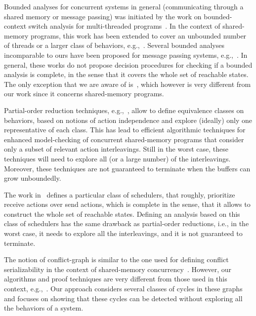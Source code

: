Bounded analyses for concurrent systems in general (communicating through a shared memory or message passing) was initiated by the work on bounded-context switch analysis for multi-threaded programs~\cite{DBLP:conf/pldi/QadeerW04,DBLP:conf/tacas/QadeerR05,DBLP:conf/cav/LalR08}. In the context of shared-memory programs, this work has been extended to cover an unbounded number of threads or a larger class of behaviors, e.g.,~\cite{DBLP:conf/sas/BouajjaniEP11,DBLP:conf/popl/EmmiQR11,DBLP:conf/spin/KiddJV10,DBLP:conf/cav/TorreMP10}. Several bounded analyses incomparable to ours have been proposed for message passing systems, e.g.,~\cite{DBLP:conf/tacas/TorreMP08,DBLP:conf/tacas/BouajjaniE12}. In general, these works do not propose decision procedures for checking if a bounded analysis is complete, in the sense that it covers the whole set of reachable states. The only exception that we are aware of is~\cite{DBLP:conf/cav/TorreMP10}, which however is very different from our work since it concerns shared-memory programs.

Partial-order reduction techniques, e.g.,~\cite{DBLP:conf/popl/AbdullaAJS14,DBLP:conf/popl/FlanaganG05}, allow to define equivalence classes on behaviors, based on notions of action independence and explore (ideally) only one representative of each class. This has lead to efficient algorithmic techniques for enhanced model-checking of concurrent shared-memory programs that consider only a subset of relevant action interleavings. Still in the worst case, these techniques will need to explore all (or a large number) of the interleavings. Moreover, these techniques are not guaranteed to terminate when the buffers can grow unboundedly.

The work in~\cite{DBLP:conf/oopsla/Desai0M14} defines a particular class of schedulers, that roughly, prioritize receive actions over send actions, which is complete in the sense, that it allows to construct the whole set of reachable states. Defining an analysis based on this class of schedulers has the same drawback as partial-order reductions, i.e., in the worst case, it needs to explore all the interleavings, and it is not guaranteed to terminate. 

The notion of conflict-graph is similar to the one used for defining conflict serializability in the context of shared-memory concurrency~\cite{journals/jacm/Papadimitriou79b}. However, our algorithms and proof techniques are very different from those used in this context, e.g.,~\cite{DBLP:journals/iandc/AlurMP00,DBLP:conf/esop/BouajjaniEEH13,DBLP:conf/cav/FarzanM08}. Our approach considers several classes of cycles in these graphs and focuses on showing that these cycles can be detected without exploring all the behaviors of a system.